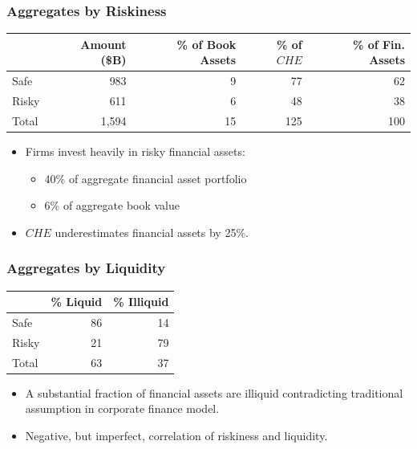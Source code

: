 \documentclass[handout]{beamer}
\begin{document}
\begin{frame}
\frametitle{Aggregates by Riskiness}

\footnotesize

\begin{center}
\begin{tabular}{ l | r r r r }
& Amount (\$B) & \% of Book Assets & \% of $CHE$ & \% of Fin. Assets\\ 
\hline
 Safe  & 983 & 9 & 77 & 62 \\  
 Risky & 611 & 6 & 48 & 38 \\
 \hline
 Total & 1,594 & 15 & 125 & 100
\end{tabular}
\end{center}

\normalsize
\begin{itemize}[<+->]
\item Firms invest heavily in risky financial assets:
\begin{itemize}[<+->]
\item 40\% of aggregate financial asset portfolio
\item 6\% of aggregate book value
\end{itemize}
\item $CHE$ underestimates financial assets by 25\%.
\end{itemize}

\end{frame}




\begin{frame}
\frametitle{Aggregates by Liquidity}

\footnotesize

\begin{center}
\begin{tabular}{ l | r r}
& \% Liquid & \% Illiquid \\ 
\hline
 Safe  & 86 & 14 \\  
 Risky & 21 & 79 \\
 \hline
 Total & 63 & 37
\end{tabular}
\end{center}

\normalsize

\begin{itemize}[<+->]
\item A substantial fraction of financial assets are illiquid contradicting traditional assumption in corporate finance model.
\item Negative, but imperfect, correlation of riskiness and liquidity.
\end{itemize}

\end{frame}
\end{document}
